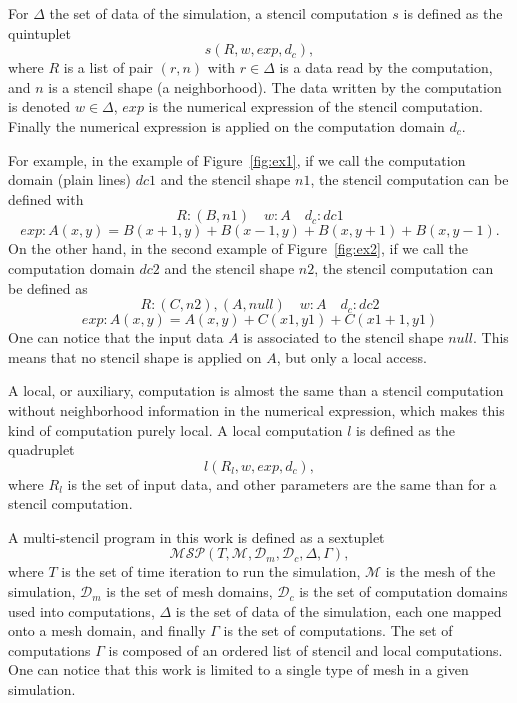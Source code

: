 For $\Delta$ the set of data of the simulation, a stencil computation $s$ is defined as the quintuplet
\begin{equation} 
s(R,w,exp,d_c),
\label{eq:st}
\end{equation}
where $R$ is a list of pair $(r,n)$ with $r \in \Delta$ is a data read by the computation, and $n$ is a stencil shape (a neighborhood). The data written by the computation is denoted $w \in \Delta$, $exp$ is the numerical expression of the stencil computation. Finally the numerical expression is applied on the computation domain $d_c$.

For example, in the example of Figure~\ref{fig:ex1}, if we call the computation domain (plain lines) $dc1$ and the stencil shape $n1$, the stencil computation can be defined with
\begin{equation*}
R: {(B,n1)} \quad w: A \quad d_c: dc1
\end{equation*}
\begin{equation*}
exp: A(x,y)=B(x+1,y)+B(x-1,y)+B(x,y+1)+B(x,y-1).
\end{equation*}
On the other hand, in the second example of Figure~\ref{fig:ex2}, if we call the computation domain $dc2$ and the stencil shape $n2$, the stencil computation can be defined as
\begin{equation*}
R: {(C,n2),(A,null)} \quad w: A \quad d_c: dc2
\end{equation*}
\begin{equation*}
exp: A(x,y)=A(x,y)+C(x1,y1)+C(x1+1,y1)
\end{equation*}
One can notice that the input data $A$ is associated to the stencil shape $null$. This means that no stencil shape is applied on $A$, but only a local access.

A local, or auxiliary, computation is almost the same than a stencil computation without neighborhood information in the numerical expression, which makes this kind of computation purely local. A local computation $l$ is defined as the quadruplet
\begin{equation} 
l(R_l,w,exp,d_c),
\label{eq:loc}
\end{equation}
where $R_l$ is the set of input data, and other parameters are the same than for a stencil computation.

A multi-stencil program in this work is defined as a sextuplet
\begin{equation} 
\mathcal{MSP}(T,\mathcal{M},\mathcal{D}_m,\mathcal{D}_c,\Delta,\Gamma),
\label{eq:msp}
\end{equation}
where $T$ is the set of time iteration to run the simulation, $\mathcal{M}$ is the mesh of the simulation, $\mathcal{D}_m$ is the set of mesh domains, $\mathcal{D}_c$ is the set of computation domains used into computations, $\Delta$ is the set of data of the simulation, each one mapped onto a mesh domain, and finally $\Gamma$ is the set of computations. The set of computations $\Gamma$ is composed of an ordered list of stencil and local computations. One can notice that this work is limited to a single type of mesh in a given simulation.

